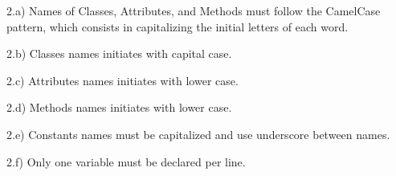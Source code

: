 \documentclass[12pt,openright,a4paper,conference,onecolumn,twoside,english,french,spanish]{IEEEtran}
\begin{document}
2.a) Names of Classes, Attributes, and Methods must follow the CamelCase
pattern, which consists in capitalizing the initial letters of each
word.

2.b) Classes names initiates with capital case.

\begin{Shaded}
\begin{Highlighting}[]
  
\end{Highlighting}
\end{Shaded}

2.c) Attributes names initiates with lower case.

\begin{Shaded}
\begin{Highlighting}[]
 \NormalTok{;}
\end{Highlighting}
\end{Shaded}

2.d) Methods names initiates with lower case.

\begin{Shaded}
\begin{Highlighting}[]
 \NormalTok{= }
     
\NormalTok{\}}
\end{Highlighting}
\end{Shaded}

2.e) Constants names must be capitalized and use underscore between
names.

\begin{Shaded}
\begin{Highlighting}[]
 \NormalTok{;}
\end{Highlighting}
\end{Shaded}

2.f) Only one variable must be declared per line.

\begin{Shaded}
\begin{Highlighting}[]
 \NormalTok{,}
    \NormalTok{,}
    \NormalTok{,}
    \NormalTok{;}
\end{Highlighting}
\end{Shaded}
\end{document}
